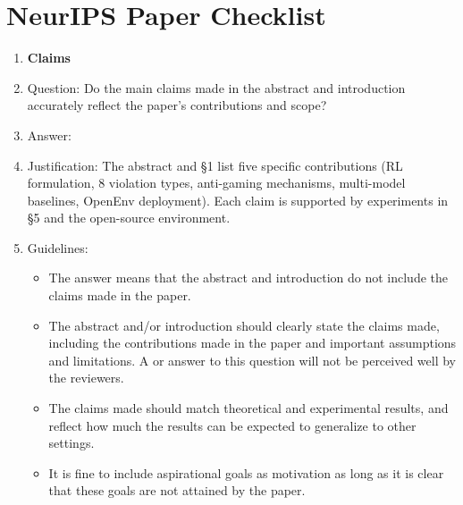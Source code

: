 \section*{NeurIPS Paper Checklist}

\begin{enumerate}

\item {\bf Claims}
    \item[] Question: Do the main claims made in the abstract and introduction accurately reflect the paper's contributions and scope?
    \item[] Answer: \answerYes{}
    \item[] Justification: The abstract and \S1 list five specific contributions (RL formulation, 8 violation types, anti-gaming mechanisms, multi-model baselines, OpenEnv deployment). Each claim is supported by experiments in \S5 and the open-source environment.
    \item[] Guidelines: \begin{itemize}
        \item The answer \answerNA{} means that the abstract and introduction do not include the claims made in the paper.
        \item The abstract and/or introduction should clearly state the claims made, including the contributions made in the paper and important assumptions and limitations. A \answerNo{} or \answerNA{} answer to this question will not be perceived well by the reviewers.
        \item The claims made should match theoretical and experimental results, and reflect how much the results can be expected to generalize to other settings.
        \item It is fine to include aspirational goals as motivation as long as it is clear that these goals are not attained by the paper.
    \end{itemize}


\end{enumerate}
